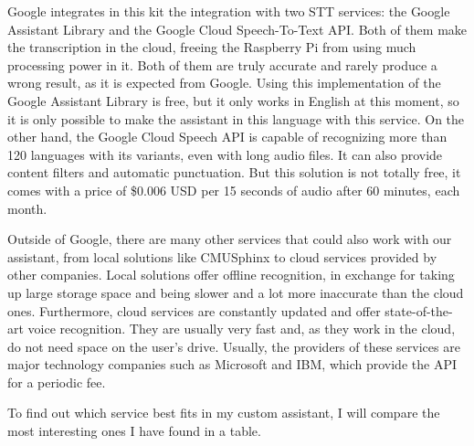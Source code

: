 Google integrates in this kit the integration with two STT services: the Google Assistant Library and the Google Cloud 
Speech-To-Text API. Both of them make the transcription in the cloud, freeing the Raspberry Pi from using much processing power 
in it. Both of them are truly accurate and rarely produce a wrong result, as it is expected from Google. Using this implementation 
of the Google Assistant Library is free, but it only works in English at this moment, so it is only possible to make the assistant 
in this language with this service. On the other hand, the Google Cloud Speech API is capable of recognizing more than 120 languages 
with its variants, even with long audio files. It can also provide content filters and automatic punctuation. But this solution is 
not totally free, it comes with a price of \$0.006 USD per 15 seconds of audio after 60 minutes, each month.

Outside of Google, there are many other services that could also work with our assistant, from local solutions like CMUSphinx to 
cloud services provided by other companies. Local solutions offer offline recognition, in exchange for taking up large storage space 
and being slower and a lot more inaccurate than the cloud ones. Furthermore, cloud services are constantly updated and offer 
state-of-the-art voice recognition. They are usually very fast and, as they work in the cloud, do not need space on the user's drive. 
Usually, the providers of these services are major technology companies such as Microsoft and IBM, which provide the API for a 
periodic fee.

To find out which service best fits in my custom assistant, I will compare the most interesting ones I have found in a table.

